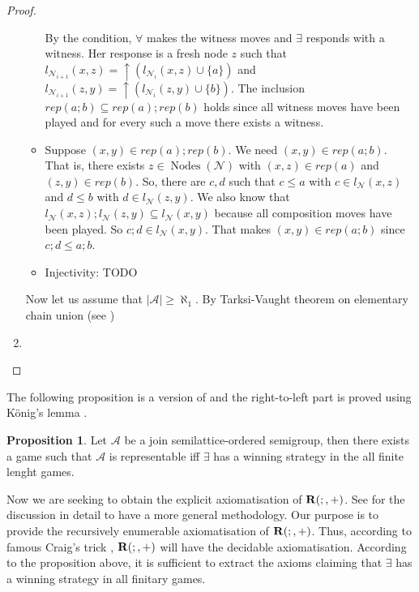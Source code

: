 \documentclass[a4paper]{article}
\theoremstyle{definition}
\theoremstyle{theorem}
\theoremstyle{proposition}
\newtheorem{proposition}{Proposition}
\theoremstyle{lemma}
\theoremstyle{ex}
\theoremstyle{corollary}
\theoremstyle{claim}
\begin{document}
\begin{proof}
\begin{enumerate}
\begin{itemize}
By the condition, $\forall$ makes the witness moves and $\exists$ responds with a witness. Her response is a fresh node $z$ such that $l_{\mathcal{N}_{i + 1}}(x, z) =  \uparrow (l_{\mathcal{N}_i}(x, z) \cup \{ a \})$ and $l_{\mathcal{N}_{i + 1}}(z, y) = \uparrow (l_{\mathcal{N}_i}(z, y) \cup \{ b\})$. The inclusion $rep(a ; b) \subseteq rep(a) ; rep(b)$ holds since all witness moves have been played and for every such a move there exists a witness.

\item Suppose $(x, y) \in rep(a) ; rep(b)$. We need $(x, y) \in rep(a;b)$. That is, there exists $z \in \operatorname{Nodes}(\mathcal{N})$ with $(x, z) \in rep(a)$ and $(z, y) \in rep(b)$. So, there are $c, d$ such that $c \leq a$ with $c \in l_{\mathcal{N}}(x, z)$ and $d \leq b$ with $d \in l_{\mathcal{N}}(z, y)$.
We also know that $l_{\mathcal{N}}(x, z) ; l_{\mathcal{N}}(z, y) \subseteq l_{\mathcal{N}}(x, y)$ because all composition moves have been played.
So $c ; d \in l_{\mathcal{N}}(x, y)$. That makes $(x, y) \in rep(a;b)$ since $c ; d \leq a ; b$.

\item Injectivity: TODO

\end{itemize}
Now let us assume that $|\mathcal{A}| \geq \aleph_1$. By Tarksi-Vaught theorem on elementary chain union (see \cite[Theorem 2.5.2]{hodges1997shorter})

\item
  \end{enumerate}
\end{proof}

The following proposition is a version of \cite[Proposition 7.24]{hirsch2002relation} and the right-to-left part is proved using K\"{o}nig's lemma \cite[Exercise 5.6.3]{hodges1997shorter}.

\begin{proposition}
  Let $\mathcal{A}$ be a join semilattice-ordered semigroup, then there exists a game such that $\mathcal{A}$ is representable iff $\exists$ has a winning strategy in the all finite lenght games.
\end{proposition}

Now we are seeking to obtain the explicit axiomatisation of ${\bf R}(;, +)$. See \cite[Chapter 9]{hirsch2002relation} for the discussion in detail to have a more general methodology. Our purpose is to provide the recursively enumerable axiomatisation of ${\bf R}(;, +)$. Thus, according to famous Craig's trick \cite{craig1953axiomatizability}, ${\bf R}(;, +)$ will have the decidable axiomatisation. According to the proposition above, it is sufficient to extract the axioms claiming that $\exists$ has a winning strategy in all finitary games.
\end{document}
